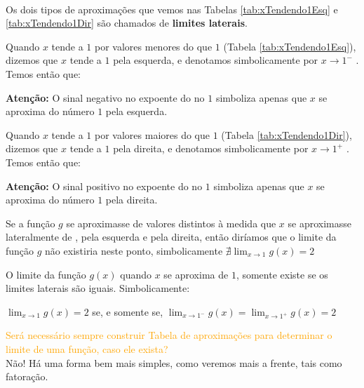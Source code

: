 \cleardoublepage\documentclass[../main.tex]{subfiles}
\begin{document}
\begin{obs}~
  \begin{compactenum}[1)]
  \item Os dois tipos de aproximações que vemos nas Tabelas \ref{tab:xTendendo1Esq} e \ref{tab:xTendendo1Dir} são chamados de \textbf{limites laterais}.
  \begin{compactenum}[a)]
\item Quando $x$ tende a $1$ por valores menores do que $1$ (Tabela \ref{tab:xTendendo1Esq}), dizemos que $x$ tende a $1$ pela esquerda, e denotamos simbolicamente por $x\to 1^-$ . Temos então que:

\begin{multicols}{2}
\begin{framed}\end{framed}
\textbf{Atenção:} \textcolor{black!40!red}{ O sinal negativo no expoente do no $1$ simboliza apenas que $x$ se
aproxima do número $1$ pela esquerda.}
\end{multicols}

\item Quando $x$ tende a $1$ por valores maiores do que $1$ (Tabela \ref{tab:xTendendo1Dir}), dizemos que $x$ tende a $1$ pela direita, e denotamos simbolicamente por $x\to 1^+$ . Temos então que:
\begin{multicols}{2}
\begin{framed}\end{framed}
\textbf{Atenção:} \textcolor{black!40!red}{ O sinal positivo no expoente do no $1$ simboliza apenas que $x$ se
aproxima do número $1$ pela direita.}
\end{multicols}
\end{compactenum}
\item Se a função $g$ se aproximasse de valores distintos à medida que $x$ se aproximasse lateralmente de
, pela esquerda e pela direita, então diríamos que o limite da função $g$ não existiria neste ponto,
simbolicamente  $\displaystyle\nexists \lim_{x\to 1} g(x)=2$
\item  O limite da função $g(x)$ quando $x$ se aproxima de $1$, somente existe se os limites laterais são
iguais. Simbolicamente:
\begin{framed}
 $\displaystyle \lim_{x\to 1} g(x)=2$ se, e somente se, $\displaystyle\lim_{x\to 1^-} g(x)=\lim_{x\to 1^+} g(x)=2$
\end{framed}
  \end{compactenum}
\end{obs}
\textcolor{orange}{Será necessário sempre construir Tabela de aproximações para determinar o limite de uma função,
caso ele exista?}\\
Não! Há uma forma bem mais simples, como veremos mais a frente, tais como fatoração.
\end{document}
